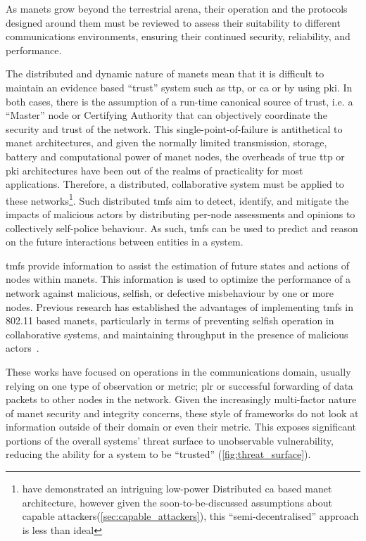 As \glspl{manet} grow beyond the terrestrial arena, their operation and the protocols designed around them must be reviewed to assess their suitability to different communications environments, ensuring their continued security, reliability, and performance.

The distributed and dynamic nature of \glspl{manet} mean that it is difficult to maintain an evidence based ``trust'' system such as \gls{ttp}, or \gls{ca} or by using \gls{pki}. 
In both cases, there is the assumption of a run-time canonical source of trust, i.e. a ``Master'' node or Certifying Authority that can objectively coordinate the security and trust of the network.
This single-point-of-failure is antithetical to \gls{manet} architectures, and given the normally limited transmission, storage, battery and computational power of \gls{manet} nodes, the overheads of true \gls{ttp} or \gls{pki} architectures have been out of the realms of practicality for most applications.
Therefore, a distributed, collaborative system must be applied to these networks\footnote{\citet{Zouridaki} have demonstrated an intriguing low-power Distributed \gls{ca} based \gls{manet} architecture, however given the soon-to-be-discussed assumptions about capable attackers(\autoref{sec:capable_attackers}), this ``semi-decentralised'' approach is less than ideal}.
Such distributed \glspl{tmf} aim to detect, identify, and mitigate the impacts of malicious actors by distributing per-node assessments and opinions to collectively self-police behaviour.
As such, \glspl{tmf} can be used to predict and reason on the future interactions between entities in a system.

\glspl{tmf} provide information to assist the estimation of future states and actions of nodes within \glspl{manet}.
This information is used to optimize the performance of a network against malicious, selfish, or defective misbehaviour by one or more nodes.
Previous research has established the advantages of implementing \glspl{tmf} in 802.11 based \glspl{manet}, particularly in terms of preventing selfish operation in collaborative systems, and maintaining throughput in the presence of malicious actors~\cite{Li2007, Buchegger2002}.

These works have focused on operations in the communications domain, usually relying on one type of observation or metric; \gls{plr} or successful forwarding of data packets to other nodes in the network.
Given the increasingly multi-factor nature of \gls{manet} security and integrity concerns, these style of frameworks do not look at information outside of their domain or even their metric. 
This exposes significant portions of the overall systems' threat surface to unobservable vulnerability, reducing the ability for a system to be ``trusted'' (\autoref{fig:threat_surface}).

